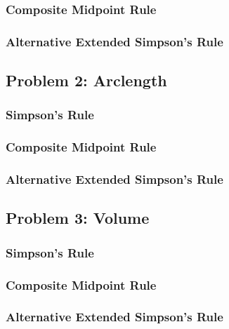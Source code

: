 \documentclass[a4paper12pt,titlepage]{article}
\begin{document}
        \subsubsection{Composite Midpoint Rule}
        
     \clearpage
       \subsubsection{Alternative Extended Simpson's Rule}
        
    \clearpage
    \subsection{Problem 2: Arclength}
        \subsubsection{Simpson's Rule}
        
    \clearpage
        \subsubsection{Composite Midpoint Rule}
        
     \clearpage
       \subsubsection{Alternative Extended Simpson's Rule}
        
    \clearpage
    \subsection{Problem 3: Volume}
        \subsubsection{Simpson's Rule}
        
     \clearpage
       \subsubsection{Composite Midpoint Rule}
        
    \clearpage
        \subsubsection{Alternative Extended Simpson's Rule}
        
\end{document}
